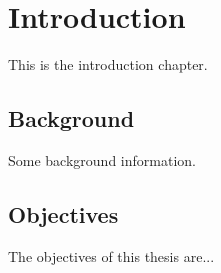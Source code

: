 \chapter{Introduction}
This is the introduction chapter.

\section{Background}
Some background information.

\section{Objectives}
The objectives of this thesis are...



